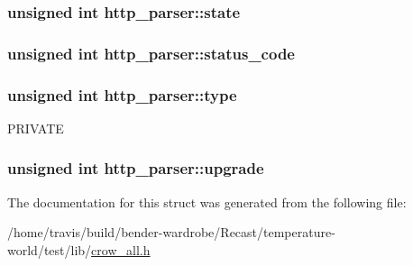 \hypertarget{structhttp__parser_a6f5952e0b47c83aeacf64fc287fd8003}{
\subsubsection[{state}]{\setlength{\rightskip}{0pt plus 5cm}unsigned int http\-\_\-parser\-::state}}\label{structhttp__parser_a6f5952e0b47c83aeacf64fc287fd8003}
\hypertarget{structhttp__parser_a82f5aed92ca3566489def7bc384bab26}{
\subsubsection[{status\-\_\-code}]{\setlength{\rightskip}{0pt plus 5cm}unsigned int http\-\_\-parser\-::status\-\_\-code}}\label{structhttp__parser_a82f5aed92ca3566489def7bc384bab26}
\hypertarget{structhttp__parser_ac6c327558547d55eb64a8aea1310cc2e}{
\subsubsection[{type}]{\setlength{\rightskip}{0pt plus 5cm}unsigned int http\-\_\-parser\-::type}}\label{structhttp__parser_ac6c327558547d55eb64a8aea1310cc2e}
P\-R\-I\-V\-A\-T\-E \hypertarget{structhttp__parser_a748f476eacc5ac56b84dd07dbafb42a4}{
\subsubsection[{upgrade}]{\setlength{\rightskip}{0pt plus 5cm}unsigned int http\-\_\-parser\-::upgrade}}\label{structhttp__parser_a748f476eacc5ac56b84dd07dbafb42a4}


The documentation for this struct was generated from the following file\-:\begin{DoxyCompactItemize}
\item 
/home/travis/build/bender-\/wardrobe/\-Recast/temperature-\/world/test/lib/\hyperlink{crow__all_8h}{crow\-\_\-all.\-h}\end{DoxyCompactItemize}
